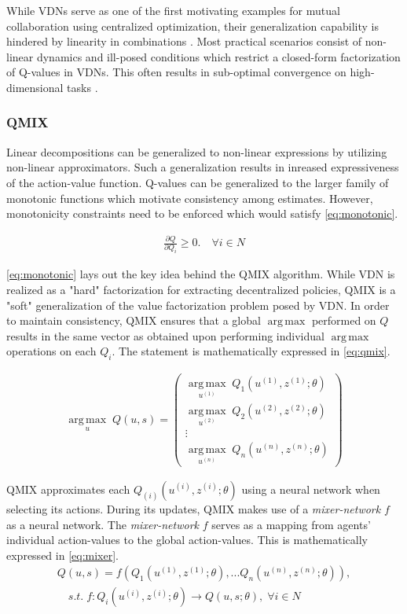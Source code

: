 \documentclass{article}
\DeclareMathOperator*{\argmax}{arg\,max}
\begin{document}
\begin{multicols}{2}
While VDNs serve as one of the first motivating examples for mutual collaboration using centralized optimization, their generalization capability is hindered by linearity in combinations \cite{qmix}. Most practical scenarios consist of non-linear dynamics and ill-posed conditions which restrict a closed-form factorization of Q-values in VDNs. This often results in sub-optimal convergence on high-dimensional tasks \cite{qmix}.

\subsubsection{QMIX}
Linear decompositions can be generalized to non-linear expressions by utilizing non-linear approximators. Such a generalization results in inreased expressiveness of the action-value function. Q-values can be generalized to the larger family of monotonic functions which motivate consistency among estimates. However, monotonicity constraints need to be enforced which would satisfy \autoref{eq:monotonic}.

\begin{gather}
  \frac{\partial Q}{\partial Q_{i}} \geq 0.\quad \forall i \in N \label{eq:monotonic}
\end{gather}

\autoref{eq:monotonic} lays out the key idea behind the QMIX \cite{qmix} algorithm. While VDN is realized as a "hard" factorization for extracting decentralized policies, QMIX is a "soft" generalization of the value factorization problem posed by VDN. In order to maintain consistency, QMIX ensures that a global $\argmax$ performed on $Q$ results in the same vector as obtained upon performing individual $\argmax$ operations on each $Q_{i}$. The statement is mathematically expressed in \autoref{eq:qmix}.

\begin{gather}
   \underset{u}{\argmax}\; Q(u,s) = \begin{pmatrix}
    \underset{u^{(1)}}{\argmax}\; Q_{1}(u^{(1)},z^{(1)};\theta) \\
    \underset{u^{(2)}}{\argmax}\; Q_{2}(u^{(2)},z^{(2)};\theta) \\
    \vdots \\
    \underset{u^{(n)}}{\argmax}\; Q_{n}(u^{(n)},z^{(n)};\theta)
  \end{pmatrix} \label{eq:qmix}
\end{gather}

QMIX approximates each $Q_{(i)}(u^{(i)},z^{(i)};\theta)$ using a neural network when selecting its actions. During its updates, QMIX makes use of a \textit{mixer-network} $f$ as a neural network. The \textit{mixer-network} $f$ serves as a mapping from agents' individual action-values to the global action-values. This is mathematically expressed in \autoref{eq:mixer}.
\begin{multline}
  Q(u,s) = f(Q_{1}(u^{(1)},z^{(1)};\theta),...Q_{n}(u^{(n)},z^{(n)};\theta)),\\
  \quad s.t.\; f:Q_{i}(u^{(i)},z^{(i)};\theta)\rightarrow Q(u,s;\theta), \; \forall i \in N \label{eq:mixer}
\end{multline}


\end{multicols}
\end{document}
